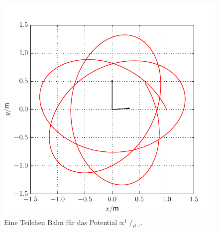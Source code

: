 \begin{figure}[H]
	\centering
	\includegraphics[width = \textwidth]{../Plots/Plot_4_E_2.pdf}
	\caption{Eine Teilchen Bahn für das Potential$\propto^1\!/_{r^{1,1}}$.\label{fig:E2}}
\end{figure}
